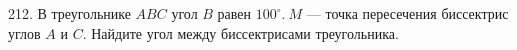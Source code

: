 212. В треугольнике $ABC$ угол $B$ равен $100^\circ.\ M$ --- точка пересечения биссектрис углов $A$ и $C.$
Найдите угол между биссектрисами треугольника.\\
